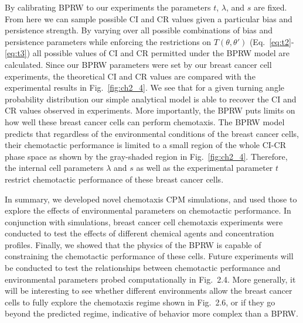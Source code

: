 By calibrating BPRW to our experiments the parameters $t$, $\lambda$, and $s$ are fixed. From here we can sample possible CI and CR values given a particular bias and persistence strength. By varying over all possible combinations of bias and persistence parameters while enforcing the restrictions on $T(\theta,\theta')$ (Eq.\ \ref{eq:t2}-\ref{eq:t3}) all possible values of CI and CR permitted under the BPRW model are calculated. Since our BPRW parameters were set by our breast cancer cell experiments, the theoretical CI and CR values are compared with the experimental results in  Fig.\ \ref{fig:ch2_4}. We see that for a given turning angle probability distribution our simple analytical model is able to recover the CI and CR values observed in experiments. More importantly, the BPRW puts limits on how well these breast cancer cells can perform chemotaxis. The BPRW model predicts that regardless of the environmental conditions of the breast cancer cells, their chemotactic performance is limited to a small region of the whole CI-CR phase space as shown by the gray-shaded region in Fig.\ \ref{fig:ch2_4}. Therefore, the internal cell parameters $\lambda$ and $s$ as well as the experimental parameter $t$ restrict chemotactic performance of these breast cancer cells.

In summary, we developed novel chemotaxis CPM simulations, and used those to explore the effects of environmental parameters on chemotactic performance. In conjunction with simulations, breast cancer cell chemotaxis experiments were conducted to test the effects of different chemical agents and concentration profiles. Finally, we showed that the physics of the BPRW is capable of constraining the chemotactic performance of these cells. Future experiments will be conducted to test the relationships between chemotactic performance and environmental parameters probed computationally in Fig.\ 2.4. More generally, it will be interesting to see whether different environments allow the breast cancer cells to fully explore the chemotaxis regime shown in Fig.\ 2.6, or if they go beyond the predicted regime, indicative of behavior more complex than a BPRW.
